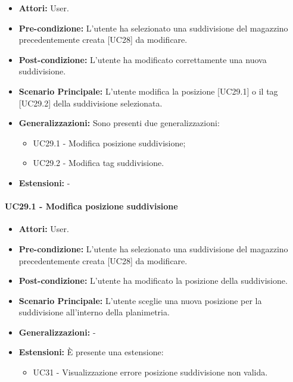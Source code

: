 \begin{itemize}
    \item \textbf{Attori:} User.
    \item \textbf{Pre-condizione:}  L'utente ha selezionato una suddivisione del magazzino precedentemente creata [UC28] da modificare.
    \item \textbf{Post-condizione:} L'utente ha modificato correttamente una nuova suddivisione.
    \item \textbf{Scenario Principale:} L'utente modifica la posizione [UC29.1] o il tag [UC29.2] della suddivisione selezionata.
    \item \textbf{Generalizzazioni:} Sono presenti due generalizzazioni:
    \begin{itemize}
        \item UC29.1 - Modifica posizione suddivisione;
        \item UC29.2 - Modifica tag suddivisione.
    \end{itemize}
    \item \textbf{Estensioni:} -
\end{itemize}

\paragraph{UC29.1 - Modifica posizione suddivisione}
\begin{itemize}
    \item \textbf{Attori:} User.
    \item \textbf{Pre-condizione:} L'utente ha selezionato una suddivisione del magazzino precedentemente creata [UC28] da modificare.
    \item \textbf{Post-condizione:} L'utente ha modificato la posizione della suddivisione.
    \item \textbf{Scenario Principale:} L'utente sceglie una nuova posizione per la suddivisione all'interno della planimetria.
    \item \textbf{Generalizzazioni:} -
    \item \textbf{Estensioni:} È presente una estensione:
        \begin{itemize}
            \item UC31 - Visualizzazione errore posizione suddivisione non valida.
        \end{itemize}
\end{itemize}

